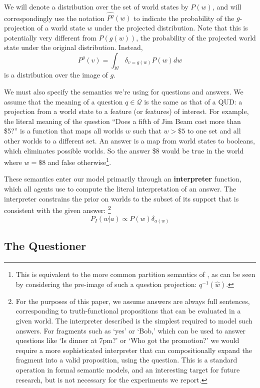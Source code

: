 \documentclass[12pt, floatsintext, jou]{apa6}
\begin{document}
We will denote a distribution over the set of world states by $P(w)$, and will correspondingly use the notation $\widehat{P^g}(w)$ to indicate the probability of the $g$-projection of a world state $w$ under the projected distribution. Note that this is potentially very different from $P(g(w))$, the probability of the projected world state under the original distribution. Instead, 
$$\widehat{P^g}(v) = \int_{\mathcal{W}} \delta_{v=g(w)}P(w)dw$$ is a distribution over the image of $g$.

We must also specify the semantics we're using for questions and answers. We assume that the meaning of a question $q \in \mathcal{Q}$ is the same as that of a QUD: a projection from a world state to a feature (or features) of interest. For example, the literal meaning of the question ``Does a fifth of Jim Beam cost more than \$5?'' is a function that maps all worlds $w$ such that $w > \$5$ to one set and all other worlds to a different set. An answer is a map from world states to booleans, which eliminates possible worlds. So the answer \$8 would be true in the world where $w = \$8$ and false otherwise\footnote{This is equivalent to the more common partition semantics of , as can be seen by considering the pre-image of such a question projection: $q^{-1}(\hat{w})$.}.

These semantics enter our model primarily through an \textbf{interpreter} function, which all agents use to compute the literal interpretation of an answer. The interpreter constrains the prior on worlds to the subset of its support that is consistent with the given answer:%
\footnote{For the purposes of this paper, we assume answers are always full sentences, corresponding to truth-functional propositions that can be evaluated in a given world. The interpreter described is the simplest required to model such answers. For fragments such as `yes' or `Bob,' which can be used to answer questions like `Is dinner at 7pm?' or `Who got the promotion?' we would require a more sophisticated interpreter that can compositionally expand the fragment into a valid proposition, using the question. This is a standard operation in formal semantic models, and an interesting target for future research, but is not necessary for the experiments we report.}
%
$$P_I(w | a) \propto P(w) \delta_{a(w)}$$
%

\subsection{The Questioner}
\end{document}
